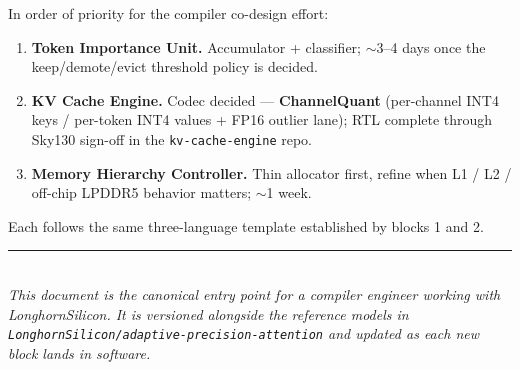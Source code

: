 \documentclass[11pt]{article}
\begin{document}
In order of priority for the compiler co-design effort:

\begin{enumerate}
\item \textbf{Token Importance Unit.} Accumulator + classifier;
      $\sim$3--4 days once the keep/demote/evict threshold policy
      is decided.
\item \textbf{KV Cache Engine.} Codec decided --- \textbf{ChannelQuant}
      (per-channel INT4 keys / per-token INT4 values + FP16 outlier lane);
      RTL complete through Sky130 sign-off in the \texttt{kv-cache-engine} repo.
\item \textbf{Memory Hierarchy Controller.} Thin allocator first,
      refine when L1 / L2 / off-chip LPDDR5 behavior matters; $\sim$1 week.
\end{enumerate}

Each follows the same three-language template established by blocks
1 and 2.

\vspace{0.5in}
\noindent\rule{\textwidth}{0.4pt}\\
\noindent\small\textit{This document is the canonical entry point
for a compiler engineer working with LonghornSilicon. It is
versioned alongside the reference models in
\texttt{LonghornSilicon/adaptive-precision-attention} and updated
as each new block lands in software.}
\end{document}
